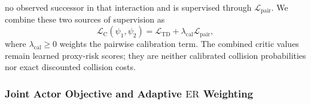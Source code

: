 \documentclass[9pt,journal]{IEEEtran}
\newcommand{\ER}{\ensuremath{\mathrm{ER}}}
\begin{document}
no observed successor in that interaction and is
supervised through $\mathcal L_{\mathrm{pair}}$. 
We combine these two sources of
supervision as
\begin{equation}
    \mathcal{L}_{\mathrm C}
    \left(\psi_1,\psi_2\right)
    =
    \mathcal{L}_{\mathrm{TD}}
    +
    \lambda_{\mathrm{cal}}
    \mathcal{L}_{\mathrm{pair}},
    \label{eq:criticloss}
\end{equation}
where $\lambda_{\mathrm{cal}}\geq0$ weights the pairwise calibration
term. 
The combined critic values remain learned proxy-risk scores; they
are neither calibrated collision probabilities nor exact discounted
collision costs.



\subsubsection{Joint Actor Objective and Adaptive \ER{} Weighting}
\label{sec:actor_objective}
\end{document}
